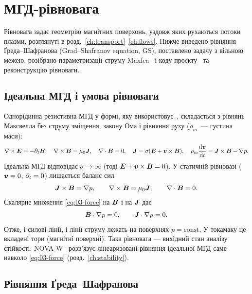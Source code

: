 \chapter{МГД-рівновага}\label{ch:equilibrium}

Рівновага задає геометрію магнітних поверхонь, уздовж яких рухаються потоки плазми, розглянуті в розд.~\ref{ch:transport}--\ref{ch:flows}. Нижче виведено рівняння Ґреда--Шафранова (Grad--Shafranov equation, GS), поставлено задачу з вільною межею, розібрано параметризації струму Maxfea~\cite{Merlo2011} і коду проєкту~\cite{ProjGSsolver} та реконструкцію рівноваги.

\section{Ідеальна МГД і умова рівноваги}\label{sec:03-mhd}

Однорідинна резистивна МГД у формі, яку використовує~\cite[с.~15]{Merlo2011}, складається з рівнянь Максвелла без струму зміщення, закону Ома і рівняння руху ($\rho_m$~--- густина маси):
\begin{equation}\label{eq:03-mhd}
\nabla\times\bm{E}=-\partial_t\bm{B},\quad \nabla\times\bm{B}=\mu_0\bm{J},\quad \nabla\cdot\bm{B}=0,\quad
\bm{J}=\sigma(\bm{E}+\bm{v}\times\bm{B}),\quad \rho_m\frac{\mathrm{d}\bm{v}}{\mathrm{d} t}=\bm{J}\times\bm{B}-\nabla p .
\end{equation}
Ідеальна МГД відповідає $\sigma\to\infty$ (тоді $\bm{E}+\bm{v}\times\bm{B}=0$). У статичній рівновазі ($\bm{v}=0$, $\partial_t=0$) лишається баланс сил~\cite[с.~16]{Merlo2011}
\begin{equation}\label{eq:03-force}
\bm{J}\times\bm{B}=\nabla p,\qquad \nabla\times\bm{B}=\mu_0\bm{J},\qquad \nabla\cdot\bm{B}=0 .
\end{equation}
Скалярне множення \eqref{eq:03-force} на $\bm{B}$ і на $\bm{J}$ дає
\begin{equation}\label{eq:03-surfaces}
\bm{B}\cdot\nabla p=0,\qquad \bm{J}\cdot\nabla p=0 .
\end{equation}
Отже, і силові лінії, і лінії струму лежать на поверхнях $p=\text{const}$. У токамаку це вкладені тори (магнітні поверхні). Така рівновага --- вихідний стан аналізу стійкості: NOVA-W~\cite[с.~7]{Ward1992} розв'язує лінеаризовані рівняння ідеальної МГД саме навколо \eqref{eq:03-force} (розд.~\ref{ch:stability}).

\section{Рівняння Ґреда--Шафранова}\label{sec:03-gs}

